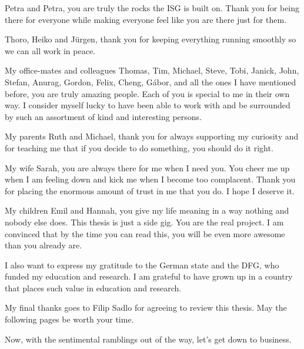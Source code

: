 %
Petra and Petra, you are truly the rocks the ISG is built on.
%
Thank you for being there for everyone while making everyone feel like you are
there just for them.
%


%
Thoro, Heiko and Jürgen, thank you for keeping everything running smoothly so we
can all work in peace.
%


%
My office-mates and colleagues Thomas, Tim, Michael, Steve, Tobi, Janick, John,
Stefan, Anurag, Gordon, Felix, Cheng, G\'abor, and all the ones I have mentioned
before, you are truly amazing people.
%
Each of you is special to me in their own way.
%
I consider myself lucky to have been able to work with and be surrounded by such
an assortment of kind and interesting persons.
%

%
My parents Ruth and Michael, thank you for always supporting my curiosity and
for teaching me that if you decide to do something, you should do it right.
%

%
My wife Sarah, you are always there for me when I need you.
%
You cheer me up when I am feeling down and kick me when I become too complacent.
%
Thank you for placing the enormous amount of trust in me that you do.
%
I hope I deserve it.
%

%
My children Emil and Hannah, you give my life meaning in a way nothing and
nobody else does.
%
This thesis is just a side gig.
%
You are the real project.
%
I am convinced that by the time you can read this, you will be even more awesome
than you already are.
%

%
I also want to express my gratitude to the German state and the DFG, who funded
my education and research.
%
I am grateful to have grown up in a country that places such value in education
and research.
%

%
My final thanks goes to Filip Sadlo for agreeing to review this thesis.
%
May the following pages be worth your time.
%

%
Now, with the sentimental ramblings out of the way, let's get down to business.
%
%
%
%
%
%
%
%
%
%
%